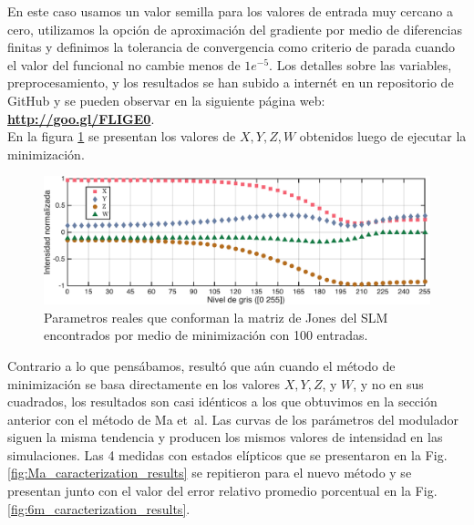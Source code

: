 En este caso usamos un valor semilla para los valores de entrada muy
cercano a cero, utilizamos la opción de aproximación del gradiente
por medio de diferencias finitas y definimos la tolerancia de
convergencia como criterio de parada cuando el valor del funcional no
cambie menos de $1e^{-5}$. Los detalles sobre las variables,
preprocesamiento, y los resultados se han subido a internét en un
repositorio de GitHub y se pueden observar en la siguiente página
web:\\
\hspace*{\fill} \href{http://goo.gl/FLIGE0}{\textbf{http://goo.gl/FLIGE0}}.\hspace*{\fill} \\
En la figura \ref{fig:xyzw} se presentan los valores de $X,Y,Z,W$ obtenidos luego de
ejecutar la minimización. 
\begin{figure}[h!]
\centering
\includegraphics[scale=.55]{xyzw.pdf}
\caption[Parametros reales que conforman la matriz de Jones del SLM
encontrados por minimización con 6 medidas]{Parametros reales que
  conforman la matriz de Jones del SLM encontrados por medio de
  minimización con 100 entradas.} 
\label{fig:xyzw}
\end{figure}
Contrario a lo que pensábamos, resultó que aún cuando el método de
minimización se basa directamente en los valores $X,Y,Z$, y $W$, y no
en sus cuadrados, los resultados son casi idénticos a los que
obtuvimos en la sección anterior con el método de Ma et~al. Las curvas
de los parámetros del modulador siguen la misma tendencia y producen
los mismos valores de intensidad en las simulaciones. Las 4 medidas
con estados elípticos que se  
presentaron en la Fig. \ref{fig:Ma_caracterization_results} se
repitieron para el nuevo método y se presentan junto con el valor del
error relativo promedio porcentual en la
Fig. \ref{fig:6m_caracterization_results}. 

